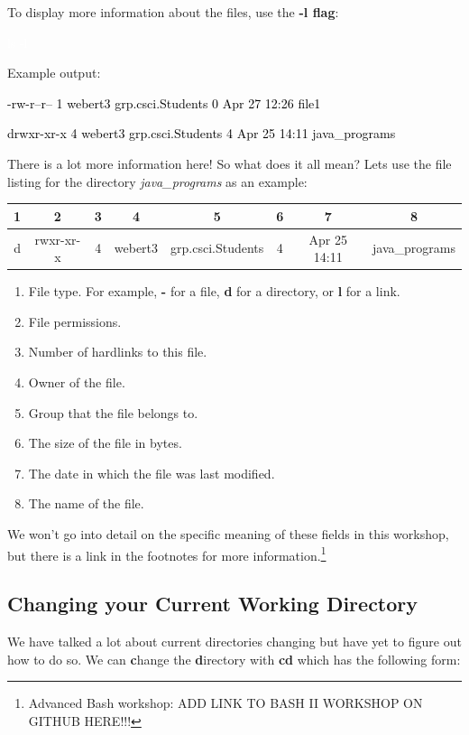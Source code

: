 \documentclass[oneside]{book}
\newcommand{\commandline}[1]{\begin{center} \colorbox{Dark}{\textcolor{white}{#1}} \end{center}}
\newcommand{\exampleout}[1]{\begin{center} \colorbox{Light}{\textcolor{black}{#1}} \end{center}}
\begin{document}
To display more information about the files, use the \textbf{-l flag}:

\commandline{ls -l}

Example output:
\exampleout{-rw-r--r-- 1 webert3 grp.csci.Students 0 Apr 27 12:26 file1}
\exampleout{drwxr-xr-x 4 webert3 grp.csci.Students 4 Apr 25 14:11 java\_programs}

There is a lot more information here! So what does it all mean? Lets use the file listing for the directory \textit{java\_programs} as an example:

\begin{center}
    \begin{tabular}{|c|c|c|c|c|c|c|c|}
        \hline
	    1 & 2 & 3 & 4 & 5 & 6 & 7 & 8 \\
	    \hline
        d & rwxr-xr-x & 4 & webert3 & grp.csci.Students & 4 & Apr 25 14:11 & java\_programs\\
        \hline
    \end{tabular}
\end{center}
	
\begin{enumerate}
    \item File type. For example, \textbf{-} for a file, \textbf{d} for a directory, or \textbf{l} for a link.
    \item File permissions. 
    \item Number of hardlinks to this file.
    \item Owner of the file.
    \item Group that the file belongs to.
    \item The size of the file in bytes.
    \item The date in which the file was last modified.
    \item The name of the file.
\end{enumerate}

We won't go into detail on the specific meaning of these fields in this workshop, but there is a link in the footnotes for more information.\footnote{Advanced Bash workshop: ADD LINK TO BASH II WORKSHOP ON GITHUB HERE!!!}
	
\subsection{Changing your Current Working Directory}
We have talked a lot about current directories changing but have yet to figure out how to do so. We can \textbf{c}hange the \textbf{d}irectory with \textbf{cd} which has the following form:
\end{document}
